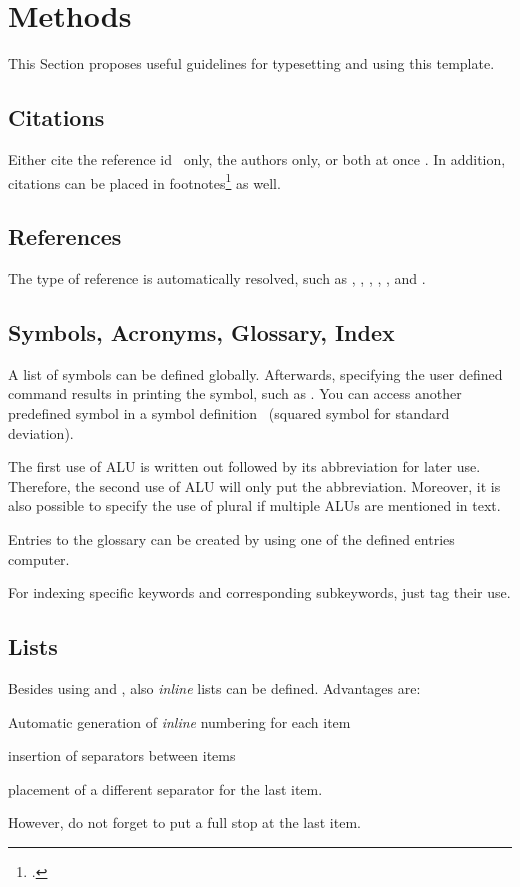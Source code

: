 \chapter{Methods}\label{sec:methods}
This Section proposes useful guidelines for typesetting and using this template.

\section{Citations}
Either cite the reference id~\parencite{RKHT17} only, the authors
\citeauthor{RKHT17} only, or both at once \eg \textcite[see][51\psq]{MGBCR04}.
In addition, citations can be placed in
footnotes\footcite[see][50\psqq]{MGBCR04} as well.

\section{References}
The type of reference is automatically resolved, such as ,
, , ,
, and .

\section{Symbols, Acronyms, Glossary, Index}
A list of symbols can be defined globally. Afterwards, specifying the user
defined command results in printing the symbol, such as \stddev. You can access
another predefined symbol in a symbol definition \eg\ \variance (squared symbol
for standard deviation).

The first use of \ac{ALU} is written out followed by its abbreviation for later
use. Therefore, the second use of \ac{ALU} will only put the abbreviation.
Moreover, it is also possible to specify the use of plural if multiple
\acp{ALU} are mentioned in text.

Entries to the glossary can be created by using one of the defined entries \eg
\gls{computer}.

For indexing specific keywords and
corresponding subkeywords, just tag their use.

\section{Lists}
Besides using  and , also \emph{inline} lists can
be defined. Advantages are:
\begin{enumerate*}[label=\upshape(\alph*),itemjoin={{; }},itemjoin*={{; and }}]
  \item Automatic generation of \emph{inline} numbering for each item
  \item insertion of separators between items
  \item placement of a different separator for the last item.
\end{enumerate*}
However, do not forget to put a full stop at the last item.

